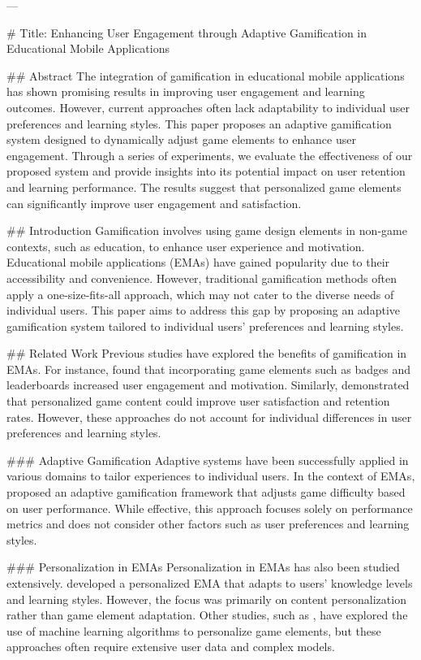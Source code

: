 ---

# Title: Enhancing User Engagement through Adaptive Gamification in Educational Mobile Applications

## Abstract
The integration of gamification in educational mobile applications has shown promising results in improving user engagement and learning outcomes. However, current approaches often lack adaptability to individual user preferences and learning styles. This paper proposes an adaptive gamification system designed to dynamically adjust game elements to enhance user engagement. Through a series of experiments, we evaluate the effectiveness of our proposed system and provide insights into its potential impact on user retention and learning performance. The results suggest that personalized game elements can significantly improve user engagement and satisfaction.

## Introduction
Gamification involves using game design elements in non-game contexts, such as education, to enhance user experience and motivation. Educational mobile applications (EMAs) have gained popularity due to their accessibility and convenience. However, traditional gamification methods often apply a one-size-fits-all approach, which may not cater to the diverse needs of individual users. This paper aims to address this gap by proposing an adaptive gamification system tailored to individual users' preferences and learning styles.

## Related Work
Previous studies have explored the benefits of gamification in EMAs. For instance, \cite{Chen2013} found that incorporating game elements such as badges and leaderboards increased user engagement and motivation. Similarly, \cite{Kim2016} demonstrated that personalized game content could improve user satisfaction and retention rates. However, these approaches do not account for individual differences in user preferences and learning styles.

### Adaptive Gamification
Adaptive systems have been successfully applied in various domains to tailor experiences to individual users. In the context of EMAs, \cite{Dunleavy2011} proposed an adaptive gamification framework that adjusts game difficulty based on user performance. While effective, this approach focuses solely on performance metrics and does not consider other factors such as user preferences and learning styles.

### Personalization in EMAs
Personalization in EMAs has also been studied extensively. \cite{Huang2015} developed a personalized EMA that adapts to users' knowledge levels and learning styles. However, the focus was primarily on content personalization rather than game element adaptation. Other studies, such as \cite{Shi2017}, have explored the use of machine learning algorithms to personalize game elements, but these approaches often require extensive user data and complex models.


